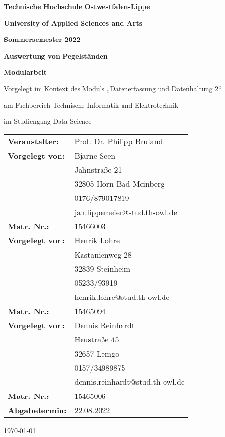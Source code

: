 \documentclass[../documentation.tex]{subfiles}
\begin{document}
\begin{titlepage}
    \begin{center}   
    {\textbf{Technische Hochschule Ostwestfalen-Lippe}}\\
    {\textbf{University of Applied Sciences and Arts}\par}\vspace{1.5cm}
    {\Large\bfseries Sommersemester 2022\par}\vspace{1.5cm}
    {\huge\bfseries Auswertung von Pegelständen\par}
    \vspace{1.5cm}
    {\Large\bfseries Modularbeit}\\
    {\large Vorgelegt im Kontext des Moduls „Datenerfassung und Datenhaltung 2“\par} \vspace{1cm}
    {\large am Fachbereich Technische Informatik und Elektrotechnik}\\
    {\large im Studiengang Data Science\par} \vspace{2cm}
    \end{center}
    \vfill
    \begin{tabular}{l l}
    \textbf{Veranstalter:}& {Prof. Dr. Philipp Bruland}\\ 
    \textbf{Vorgelegt von:}& {Bjarne Seen}\\ 
    \textbf{} & {Jahnstraße 21} \\
    \textbf{} & {32805 Horn-Bad Meinberg} \\
    \textbf{} & {0176/879017819} \\
    \textbf{} & {jan.lippemeier@stud.th-owl.de} \\
    \textbf{Matr. Nr.:} & {15466003} \\
    \textbf{Vorgelegt von:}& {Henrik Lohre}\\ 
    \textbf{} & {Kastanienweg 28} \\
    \textbf{} & {32839 Steinheim} \\
    \textbf{} & {05233/93919} \\
    \textbf{} & {henrik.lohre@stud.th-owl.de} \\
    \textbf{Matr. Nr.:} & {15465094} \\
    \textbf{Vorgelegt von:}& {Dennis Reinhardt}\\ 
    \textbf{} & {Heustraße 45} \\
    \textbf{} & {32657 Lemgo} \\
    \textbf{} & {0157/34989875} \\
    \textbf{} & {dennis.reinhardt@stud.th-owl.de} \\
    \textbf{Matr. Nr.:} & {15465006} \\
    \textbf{Abgabetermin:} & {22.08.2022} 
    \end{tabular}   
    \begin{center}
    \vfill

    {\large\today\par}
    \end{center}
\end{titlepage}
\end{document}
